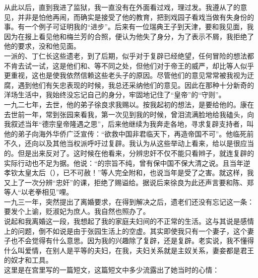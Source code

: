 从此以后，直到我进了监狱，我一直没有在外面看过戏，理过发。我遵从了的意见，并非是怕他再闹，而确实是接受了他的教育，把到戏园子看戏当做有失身份的事。有一个例子可证明我的“进步”。后来有一位瑞典王子到天津，要和我见面，我因为在报上看见他和梅兰芳的合照，便认为他失了身分，为了表示不屑，我拒绝了他的要求，没和他见面。\\

一派的、丁仁长这些遗老，到了后期，似乎对于复辟已经绝望，任何冒险的想法都不肯去试一试，这是他们和、等不同之处，但他们对于帝王的威严，却比等人似乎更重视，这也是使我依然信赖这些老头子的原因。尽管他们的意见常常被我视为迂腐，遇到他们有矢忠表现的时候，我总还采纳他们的意见。因此在那种十分新奇的洋场生活中，我始终没忘记自己的身分，牢固地记住了“皇帝”的“守则”。\\

一九二七年，去世，他的弟子徐良求我赐以。按我起初的想法，是要给他的。康在去世前一年，常到张园来看我，第一次见到我的时候，曾泪流满脸地给我磕头，向我叙述当年“德宗皇帝隆遇之思”，后来他继续为我奔走各地，寻求复辟支持者，叫他的弟子向海外华侨广泛宣传：“欲救中国非君临天下，再造帝国不可”。他临死前不久，还向以及其他当权派呼吁过复辟。我认为从这些举动上看来，给以是很应当的。但是出来反对了。这时候在他看来，分辨忠奸不仅不能只看辫子，就连复辟的实际行动也不足为据。他说：“的宗旨不纯，曾有保中国不保大清之说。且当年逆孝钦太皇太后（），已不可赦！”等人完全附和，也说当年是受了之害。就这样，我又上了一次分辨“忠奸”的课，拒绝了赐谥给。据说后来徐良为此还声言要和陈、郑等人“以老拳相见”哩。\\

一九三一年，突然提出了离婚要求，在得到解决之后，遗老们还没有忘记这一条：要发个上谕，贬淑妃为庶人。我自然也照办了。\\

说起和我离婚这一段，我想起了我的家庭夫妇间的不正常的生活。这与其说是感情上的问题，倒不如说是由于张园生活上的空虚。其实即使我只有一个妻子，这个妻子也不会觉得有什么意思。因为我的兴趣除了复辟，还是复辟。老实说，我不懂得什么叫爱情，在别人是平等的夫妇，在我，夫妇关系就是主奴关系，妻妾都是君王的奴才和工具。\\

这里是在宫里写的一篇短文，这篇短文中多少流露出了她当时的心情：\\


